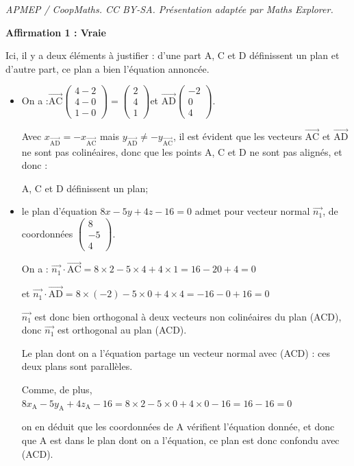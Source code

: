 \documentclass[10pt]{article}
\providecommand{\vect}[1]{\overrightarrow{#1}}
\begin{document}
\noindent\textit{APMEP / CoopMaths. CC BY-SA. Présentation adaptée par Maths Explorer.}\par\medskip
\medskip

\textbf{Affirmation 1 : Vraie}

Ici, il y a deux éléments à justifier : d'une part A, C et D définissent un plan et d'autre part, ce plan a bien l'équation annoncée.
\begin{itemize}[label=\textbullet]
	\item On a :\quad $\vect{\mathrm{AC}}\begin{pmatrix} 4 - 2\\4 - 0\\1-0 \end{pmatrix} = \begin{pmatrix} 2\\4\\1 \end{pmatrix}$\quad et \quad $\vect{\mathrm{AD}}\begin{pmatrix} -2\\0\\4\end{pmatrix}$.

	Avec $x_{\vect{\mathrm{AD}}} = -x_{\vect{\mathrm{AC}}}$ mais $y_{\vect{\mathrm{AD}} }\neq -y_{\vect{\mathrm{AC}}}$, il est évident que les vecteurs $\vect{\mathrm{AC}}$ et $\vect{\mathrm{AD}}$ ne sont pas colinéaires, donc que les points A, C et D ne sont pas alignés, et donc :

	A, C et D définissent un plan;

	\item le plan d'équation $8x-5y+4z-16=0$ admet pour vecteur normal $\vect{n_1}$, de coordonnées $\begin{pmatrix}8\\-5\\4\end{pmatrix}$.

	On a : \quad $\vect{n_1}\cdot\vect{\mathrm{AC}} = 8\times 2 - 5 \times 4 + 4 \times 1 = 16 - 20 + 4 = 0$

	 et \quad $\vect{n_1}\cdot\vect{\mathrm{AD}} = 8\times (-2) - 5 \times 0 + 4 \times 4 = -16 - 0 + 16 = 0$

	 $\vect{n_1}$ est donc bien orthogonal à deux vecteurs non colinéaires du plan (ACD), donc $\vect{n_1}$ est orthogonal au plan (ACD).

	 Le plan dont on a l'équation partage un vecteur normal avec (ACD) : ces deux plans sont parallèles.

	 Comme, de plus, \quad $8x_\mathrm{A}-5y_\mathrm{A}+4z_\mathrm{A}-16 = 8\times 2 - 5 \times 0 +4\times 0 - 16 = 16 - 16 = 0$

	 on en déduit que les coordonnées de A vérifient l'équation donnée, et donc que A est dans le plan dont on a l'équation, ce plan est donc confondu avec (ACD).
\end{itemize}
\end{document}
